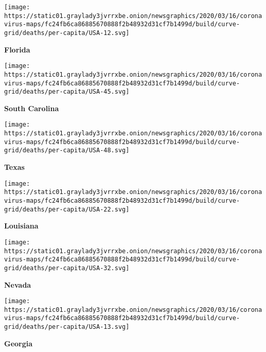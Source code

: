 \href{https://www.nytimes3xbfgragh.onion/interactive/2020/us/florida-coronavirus-cases.html}{}

\texttt{[image: https://static01.graylady3jvrrxbe.onion/newsgraphics/2020/03/16/coronavirus-maps/fc24fb6ca86885670888f2b48932d31cf7b1499d/build/curve-grid/deaths/per-capita/USA-12.svg]}

\textbf{Florida}

\href{https://www.nytimes3xbfgragh.onion/interactive/2020/us/south-carolina-coronavirus-cases.html}{}

\texttt{[image: https://static01.graylady3jvrrxbe.onion/newsgraphics/2020/03/16/coronavirus-maps/fc24fb6ca86885670888f2b48932d31cf7b1499d/build/curve-grid/deaths/per-capita/USA-45.svg]}

\textbf{South Carolina}

\href{https://www.nytimes3xbfgragh.onion/interactive/2020/us/texas-coronavirus-cases.html}{}

\texttt{[image: https://static01.graylady3jvrrxbe.onion/newsgraphics/2020/03/16/coronavirus-maps/fc24fb6ca86885670888f2b48932d31cf7b1499d/build/curve-grid/deaths/per-capita/USA-48.svg]}

\textbf{Texas}

\href{https://www.nytimes3xbfgragh.onion/interactive/2020/us/louisiana-coronavirus-cases.html}{}

\texttt{[image: https://static01.graylady3jvrrxbe.onion/newsgraphics/2020/03/16/coronavirus-maps/fc24fb6ca86885670888f2b48932d31cf7b1499d/build/curve-grid/deaths/per-capita/USA-22.svg]}

\textbf{Louisiana}

\href{https://www.nytimes3xbfgragh.onion/interactive/2020/us/nevada-coronavirus-cases.html}{}

\texttt{[image: https://static01.graylady3jvrrxbe.onion/newsgraphics/2020/03/16/coronavirus-maps/fc24fb6ca86885670888f2b48932d31cf7b1499d/build/curve-grid/deaths/per-capita/USA-32.svg]}

\textbf{Nevada}

\href{https://www.nytimes3xbfgragh.onion/interactive/2020/us/georgia-coronavirus-cases.html}{}

\texttt{[image: https://static01.graylady3jvrrxbe.onion/newsgraphics/2020/03/16/coronavirus-maps/fc24fb6ca86885670888f2b48932d31cf7b1499d/build/curve-grid/deaths/per-capita/USA-13.svg]}

\textbf{Georgia}

\href{https://www.nytimes3xbfgragh.onion/interactive/2020/us/idaho-coronavirus-cases.html}{}


